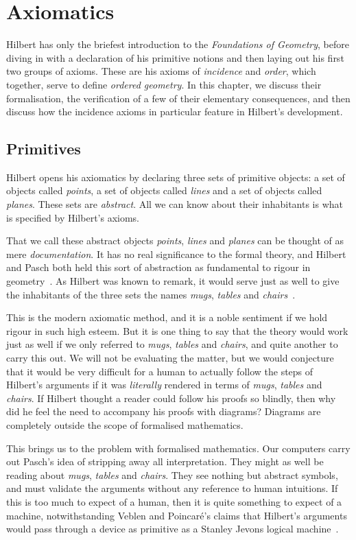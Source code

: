 \chapter{Axiomatics}\label{chapter:Axiomatics}
Hilbert has only the briefest introduction to the \emph{Foundations of Geometry}, before diving in with a declaration of his primitive notions and then laying out his first two groups of axioms. These are his axioms of \emph{incidence} and \emph{order}, which together, serve to define \emph{ordered geometry}. In this chapter, we discuss their formalisation, the verification of a few of their elementary consequences, and then discuss how the incidence axioms in particular feature in Hilbert's development.

\section{Primitives}
Hilbert opens his axiomatics by declaring three sets of primitive objects: a set of objects called \emph{points}, a set of objects called \emph{lines} and a set of objects called \emph{planes}. These sets are \emph{abstract}. All we can know about their inhabitants is what is specified by Hilbert's axioms. 

That we call these abstract objects \emph{points}, \emph{lines} and \emph{planes} can be thought of as mere \emph{documentation}. It has no real significance to the formal theory, and Hilbert and Pasch both held this sort of abstraction as fundamental to rigour in geometry~\cite{TableChairMug}. As Hilbert was known to remark, it would serve just as well to give the inhabitants of the three sets the names \emph{mugs}, \emph{tables} and \emph{chairs}~\cite{PaschToPeano}. 

This is the modern axiomatic method, and it is a noble sentiment if we hold rigour in such high esteem. But it is one thing to say that the theory would work just as well if we only referred to \emph{mugs}, \emph{tables} and \emph{chairs}, and quite another to carry this out. We will not be evaluating the matter, but we would conjecture that it would be very difficult for a human to actually follow the steps of Hilbert's arguments if it was \emph{literally} rendered in terms of \emph{mugs}, \emph{tables} and \emph{chairs}. If Hilbert thought a reader could follow his proofs so blindly, then why did he feel the need to accompany his proofs with diagrams? Diagrams are completely outside the scope of formalised mathematics.

This brings us to the problem with formalised mathematics. Our computers carry out Pasch's idea of stripping away all interpretation. They might as well be reading about \emph{mugs}, \emph{tables} and \emph{chairs}. They see nothing but abstract symbols, and must validate the arguments without any reference to human intuitions. If this is too much to expect of a human, then it is quite something to expect of a machine, notwithstanding Veblen and Poincar\'{e}'s claims that Hilbert's arguments would pass through a device as primitive as a Stanley Jevons logical machine~\cite{PoincareReview,VeblenHilbertReview}.

